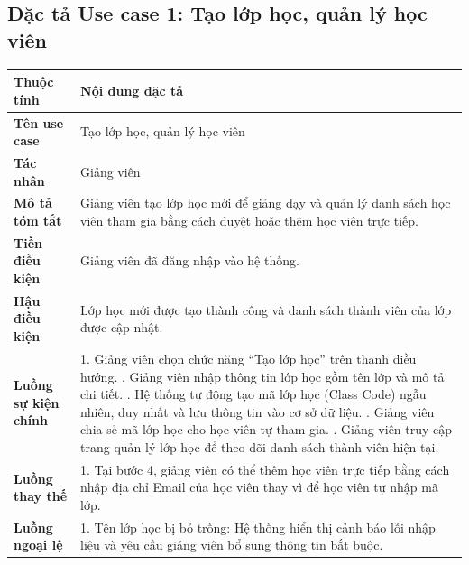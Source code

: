 \documentclass[../DoAn.tex]{subfiles}
\begin{document}
\subsection{Đặc tả Use case 1: Tạo lớp học, quản lý học viên}
\nopagebreak
\begingroup
\centering
\fontsize{11pt}{14pt}\selectfont
\begin{tabular}{|p{3.2cm}|p{10.8cm}|}
\hline
\textbf{Thuộc tính} & \textbf{Nội dung đặc tả} \\ \hline
\textbf{Tên use case} & Tạo lớp học, quản lý học viên \\ \hline
\textbf{Tác nhân} & Giảng viên \\ \hline
\textbf{Mô tả tóm tắt} & Giảng viên tạo lớp học mới để giảng dạy và quản lý danh sách học viên tham gia bằng cách duyệt hoặc thêm học viên trực tiếp. \\ \hline
\textbf{Tiền điều kiện} & Giảng viên đã đăng nhập vào hệ thống. \\ \hline
\textbf{Hậu điều kiện} & Lớp học mới được tạo thành công và danh sách thành viên của lớp được cập nhật. \\ \hline
\textbf{Luồng sự kiện chính} & 
1. Giảng viên chọn chức năng ``Tạo lớp học'' trên thanh điều hướng. \newline
2. Giảng viên nhập thông tin lớp học gồm tên lớp và mô tả chi tiết. \newline
3. Hệ thống tự động tạo mã lớp học (Class Code) ngẫu nhiên, duy nhất và lưu thông tin vào cơ sở dữ liệu. \newline
4. Giảng viên chia sẻ mã lớp học cho học viên tự tham gia. \newline
5. Giảng viên truy cập trang quản lý lớp học để theo dõi danh sách thành viên hiện tại. \\ \hline
\textbf{Luồng thay thế} & 
1. Tại bước 4, giảng viên có thể thêm học viên trực tiếp bằng cách nhập địa chỉ Email của học viên thay vì để học viên tự nhập mã lớp. \\ \hline
\textbf{Luồng ngoại lệ} & 
1. Tên lớp học bị bỏ trống: Hệ thống hiển thị cảnh báo lỗi nhập liệu và yêu cầu giảng viên bổ sung thông tin bắt buộc. \\ \hline
\end{tabular}
\label{table:uc_create_class_manage_members}
\par
\endgroup
\end{document}
